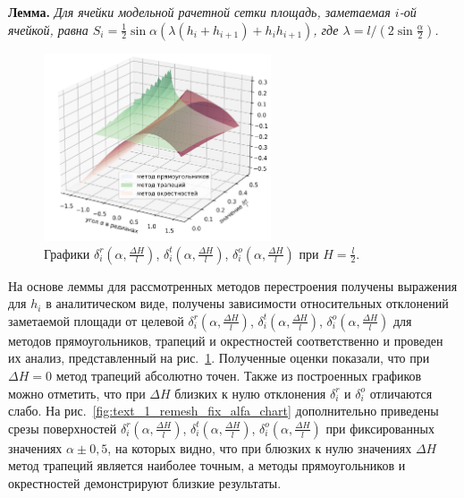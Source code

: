 \documentclass[a4paper,14pt]{extarticle}                     %
\theoremstyle{plain}                                         %
\begin{document}
\textbf{Лемма.} \textit{Для ячейки модельной рачетной сетки площадь, заметаемая $i$-ой ячейкой, равна $S_i = \frac{1}{2} \sin \alpha \left( \lambda(h_i + h_{i+1}) + h_ih_{i+1} \right)$, где $\lambda = l / (2 \sin \frac{\alpha}{2})$.}

\begin{figure}[ht]
\centering
\includegraphics[width=0.6\textwidth]{fig/2dr_remesh_3d_chart.png}
\singlespacing
\caption{Графики $\delta_i^r(\alpha, \frac{\Delta H}{l})$, $\delta_i^t(\alpha, \frac{\Delta H}{l})$, $\delta_i^o(\alpha, \frac{\Delta H}{l})$ при $H = \frac{l}{2}$.}
\label{fig:text_1_remesh_3d_main_chart}
\end{figure}

На основе леммы для рассмотренных методов перестроения получены выражения для $h_i$ в аналитическом виде, получены зависимости относительных отклонений заметаемой площади от целевой $\delta_i^r(\alpha, \frac{\Delta H}{l})$, $\delta_i^t(\alpha, \frac{\Delta H}{l})$, $\delta_i^o(\alpha, \frac{\Delta H}{l})$ для методов прямоугольников, трапеций и окрестностей соответственно и проведен их анализ, представленный на рис.~\ref{fig:text_1_remesh_3d_main_chart}.
Полученные оценки показали, что при $\Delta H = 0$ метод трапеций абсолютно точен.
Также из построенных графиков можно отметить, что при $\Delta H$ близких к нулю отклонения $\delta_i^r$ и $\delta_i^o$ отличаются слабо.
На рис.~\ref{fig:text_1_remesh_fix_alfa_chart} дополнительно приведены срезы поверхностей $\delta_i^r(\alpha, \frac{\Delta H}{l})$, $\delta_i^t(\alpha, \frac{\Delta H}{l})$, $\delta_i^o(\alpha, \frac{\Delta H}{l})$ при фиксированных значениях $\alpha \pm 0,5$, на которых видно, что при блюзких к нулю значениях $\Delta H$ метод трапеций является наиболее точным, а методы прямоугольников и окрестностей демонстрируют близкие результаты.
\end{document}
